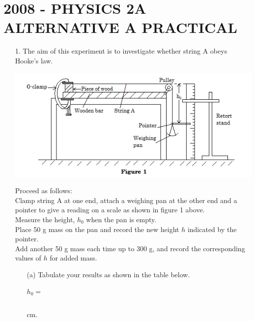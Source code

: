 \section{2008 - PHYSICS 2A  ALTERNATIVE A PRACTICAL}

\begin{enumerate}
\item[1.] The aim of this experiment is to investigate whether string A obeys Hooke's law.

\begin{center}
\includegraphics[width=15cm]{./img/2008-1-alt.png}
\end{center}

Proceed as follows:\\[6pt]

Clamp string A at one end, attach a weighing pan at the other end and a pointer to give a reading on a scale as shown in figure 1 above.\\[6pt]

Measure the height, $h_0$ when the pan is empty.\\[6pt]

Place 50 g mass on the pan and record the new height $h$ indicated by the pointer.\\[6pt]

Add another 50 g mass each time up to 300 g, and record the corresponding values of $h$ for added mass.

\begin{enumerate}
\item[(a)] Tabulate your results as shown in the table below.
\item[] $h_0 = $ \begin{tabular}{p{1.5cm}}
\\ \hline
\end{tabular} cm.\\[10pt]


\end{enumerate}
\end{enumerate}
